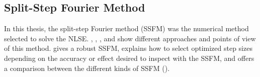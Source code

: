     \subsection{Split-Step Fourier Method}

    In this thesis, the split-step Fourier method (SSFM) was the numerical method selected to solve the NLSE. \citep{AgrawalBook}, \citep{sinkin}, \citep{robust},  and \citep{HohageSchmidt2002} show different approaches and points of view of this method.  \citep{robust} gives a robust SSFM,  \citep{sinkin} explains how to select optimized step sizes depending on the accuracy or effect desired to inspect with the SSFM, and  \citep{HohageSchmidt2002} offers a comparison between the different kinds of SSFM (). 
    
    
 
